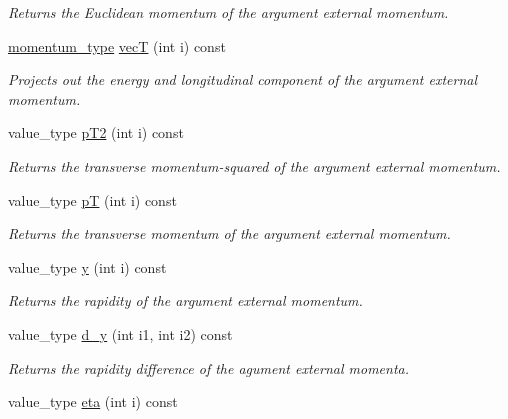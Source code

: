 \begin{DoxyCompactItemize}
\begin{DoxyCompactList}\small\item\em Returns the Euclidean momentum of the argument external momentum. \end{DoxyCompactList}\item 
\hyperlink{a00579}{momentum\+\_\+type} \hyperlink{a00451_a5d27a3b959353ca069e52ce563c69a6d}{vec\+T} (int i) const 
\begin{DoxyCompactList}\small\item\em Projects out the energy and longitudinal component of the argument external momentum. \end{DoxyCompactList}\item 
\hypertarget{a00451_ab9507bc3b8b353cad07df062dfe6b22c}{}value\+\_\+type \hyperlink{a00451_ab9507bc3b8b353cad07df062dfe6b22c}{p\+T2} (int i) const \label{a00451_ab9507bc3b8b353cad07df062dfe6b22c}

\begin{DoxyCompactList}\small\item\em Returns the transverse momentum-\/squared of the argument external momentum. \end{DoxyCompactList}\item 
\hypertarget{a00451_a6d4b77604cf7320e00d0ca61e720990f}{}value\+\_\+type \hyperlink{a00451_a6d4b77604cf7320e00d0ca61e720990f}{p\+T} (int i) const \label{a00451_a6d4b77604cf7320e00d0ca61e720990f}

\begin{DoxyCompactList}\small\item\em Returns the transverse momentum of the argument external momentum. \end{DoxyCompactList}\item 
\hypertarget{a00451_a0a1cc692e9579aeee74eebc0fcd4eb6e}{}value\+\_\+type \hyperlink{a00451_a0a1cc692e9579aeee74eebc0fcd4eb6e}{y} (int i) const \label{a00451_a0a1cc692e9579aeee74eebc0fcd4eb6e}

\begin{DoxyCompactList}\small\item\em Returns the rapidity of the argument external momentum. \end{DoxyCompactList}\item 
\hypertarget{a00451_af629dece8285b64c61332cdb751dec82}{}value\+\_\+type \hyperlink{a00451_af629dece8285b64c61332cdb751dec82}{d\+\_\+y} (int i1, int i2) const \label{a00451_af629dece8285b64c61332cdb751dec82}

\begin{DoxyCompactList}\small\item\em Returns the rapidity difference of the agument external momenta. \end{DoxyCompactList}\item 
\hypertarget{a00451_abf2be786c051c6aa81c96a5873117f0b}{}value\+\_\+type \hyperlink{a00451_abf2be786c051c6aa81c96a5873117f0b}{eta} (int i) const \label{a00451_abf2be786c051c6aa81c96a5873117f0b}


\end{DoxyCompactItemize}
